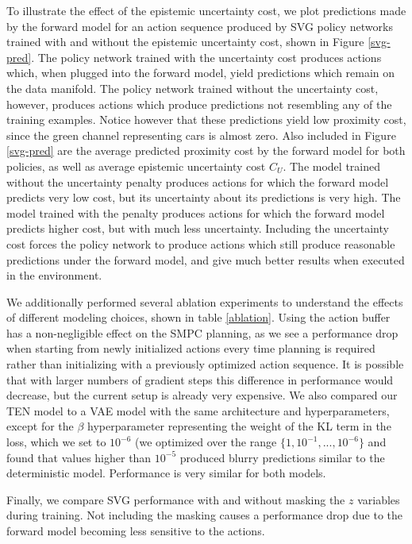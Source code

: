 \documentclass{article} %
\begin{document}
  To illustrate the effect of the epistemic uncertainty cost, we plot predictions made by the forward model for an action sequence produced by SVG policy networks trained with and without the epistemic uncertainty cost, shown in Figure \ref{svg-pred}.
  The policy network trained with the uncertainty cost produces actions which, when plugged into the forward model, yield predictions which remain on the data manifold.
  The policy network trained without the uncertainty cost, however, produces actions which produce predictions not resembling any of the training examples.
  Notice however that these predictions yield low proximity cost, since the green channel representing cars is almost zero.
  Also included in Figure \ref{svg-pred} are the average predicted proximity cost by the forward model for both policies, as well as average epistemic uncertainty cost $C_U$.
  The model trained without the uncertainty penalty produces actions for which the forward model predicts very low cost, but its uncertainty about its predictions is very high.
  The model trained with the penalty produces actions for which the forward model predicts higher cost, but with much less uncertainty.
  Including the uncertainty cost forces the policy network to produce actions which still produce reasonable predictions under the forward model, and give much better results when executed in the environment.



  We additionally performed several ablation experiments to understand the effects of different modeling choices, shown in table \ref{ablation}.
  Using the action buffer has a non-negligible effect on the SMPC planning, as we see a performance drop when starting from newly initialized actions every time planning is required rather than initializing with a previously optimized action sequence.
  It is possible that with larger numbers of gradient steps this difference in performance would decrease, but the current setup is already very expensive.
  We also compared our TEN model to a VAE model with the same architecture and hyperparameters, except for the $\beta$ hyperparameter representing the weight of the KL term in the loss, which we set to $10^{-6}$ (we optimized over the range $\{ 1, 10^{-1},..., 10^{-6} \}$ and found that values higher than $10^{-5}$ produced blurry predictions similar to the deterministic model.
  Performance is very similar for both models.

  Finally, we compare SVG performance with and without masking the $z$ variables during training.
  Not including the masking causes a performance drop due to the forward model becoming less sensitive to the actions.
\end{document}
